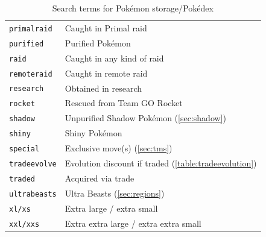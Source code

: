 \begin{table}
\begin{tabular}{ll}
\texttt{primalraid} & Caught in Primal raid\\
\texttt{purified} & Purified Pokémon\\
\texttt{raid} & Caught in any kind of raid\\
\texttt{remoteraid} & Caught in remote raid\\
\texttt{research} & Obtained in research\\
\texttt{rocket} & Rescued from Team GO Rocket\\
\texttt{shadow} & Unpurified Shadow Pokémon (\autoref{sec:shadow})\\
\texttt{shiny} & Shiny Pokémon\\
\texttt{special} & Exclusive move(s) (\autoref{sec:tms})\\
\texttt{tradeevolve} & Evolution discount if traded (\autoref{table:tradeevolution})\\
\texttt{traded} & Acquired via trade\\
\texttt{ultrabeasts} & Ultra Beasts (\autoref{sec:regions})\\
\texttt{xl/xs} & Extra large / extra small\\
\texttt{xxl/xxs} & Extra extra large / extra extra small\\
\end{tabular}
\caption{Search terms for Pokémon storage/Pokédex\label{table:searchterms}}
\end{table}
